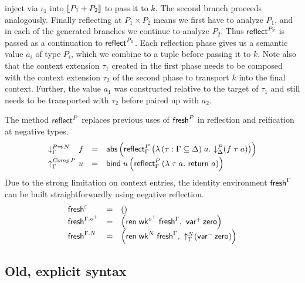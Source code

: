 \documentclass[a4paper,USenglish,cleveref, autoref]{lipics-v2019}
\begin{document}
inject via $\iota_1$ into $\mathopen{{[\kern-0.14em[}} P_1 + P_2 \mathclose{{]\kern-0.14em]}}$ to pass it to $k$.  The
second branch proceeds analogously.
Finally reflecting at $P_1 \times P_2$ means we first have to analyze
$P_1$, and in each of the generated branches we continue to analyze
$P_2$.  Thus $\mathsf{reflect}_{}^{P_2}$ is passed as a continuation to
$\mathsf{reflect}_{}^{P_1}$.  Each reflection phase gives us a semantic value
$a_i$ of type $P_i$, which we combine to a tuple before passing it to
$k$.  Note also that the context extension $\tau_1$ created in the
first phase needs to be composed with the context extension $\tau_2$
of the second phase to transport $k$ into the final context.  Further,
the value $a_1$ was constructed relative to the target of
$\tau_1$ and still needs
to be transported with $\tau_2$ before paired up with $a_2$.

The method $\mathsf{reflect}_{}^{P}$ replaces previous uses of $\mathsf{fresh}^P$ in
reflection and reification at negative types.
\[
\begin{array}{l@{~}lcl}
  \downG {P \To N} & f & = & \tabs
    \left(
      \reflect[\Gamma] P
        \left(
          \lambda \, (\tau : \Gamma \sublist \Delta) \; a .\
          \down[\Delta] P (f \; \tau \; a)
        \right)
    \right)
  \\
  \upG {\Comp P} & u & = & \tbind \; u
    \left(
      \reflect[\Gamma] P
        \left(
          \lambda \; \tau \; a .\
          \treturn\; a
        \right)
    \right)
\end{array}
\]
Due to the strong limitation on context entries,
the identity environment $\mathsf{fresh}^{\Gamma}$ can be built
straightforwardly using negative reflection.
\[
\begin{array}{lcl}
  \mathsf{fresh}^{\varepsilon} & = & () \\
  \mathsf{fresh}^{\Gamma.o^+} & = &
    \left(
      \mathsf{ren}\;\mathsf{wk}^{o^+}\;\mathsf{fresh}^{\Gamma}
      , \
      \mathsf{var}^{+}\,\mathsf{zero}
    \right) \\
  \mathsf{fresh}^{\Gamma.N} & = &
    \left(
      \mathsf{ren}\;\mathsf{wk}^N\;\mathsf{fresh}^{\Gamma}
      , \
      \mathord{\uparrow_{\Gamma}^{N}} (\mathsf{var}^{-}\,\mathsf{zero})
    \right) \\
\end{array}
\]



\clearpage

\subsection{Old, explicit syntax}
\end{document}
